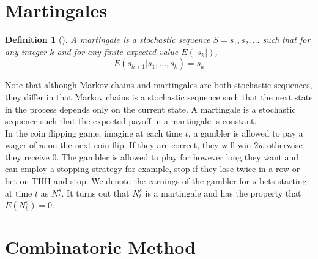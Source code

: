 \documentclass[12pt,haverford,landscape]{haverposter}
\newtheorem{definition}[theorem]{Definition}
\begin{document}
\begin{multicols}{4}

\color{Black} %

\section{\LARGE Martingales}

\begin{definition}[\cite{li}]
	A martingale is a stochastic sequence $S = s_1, s_2, ...$ such that for any
	integer $k$ and for any finite expected value $E(|s_k|)$,
	$$E(s_{k+1} | s_1, ..., s_k) = s_k$$		
\end{definition}

Note that although Markov chains and martingales are both stochastic sequences, they differ
in that Markov chains is a stochastic sequence such that
the next state in the process depends only on the current state. A martingale is a
stochastic sequence such that the expected payoff in a martingale is constant. \\
In the coin flipping game, imagine at each time $t$, a gambler
is allowed to pay a wager of $w$ on the next coin flip. If they are correct, they will
win $2w$ otherwise they receive $0$. The gambler is allowed to play for however long they
want and can employ a stopping strategy for example, stop if they lose twice in a row or
bet on THH and stop. We denote the earnings of the gambler for $s$ bets starting at time
$t$ as $N_t^s$. It turns out that $N_t^s$ is a martingale and has the property that
$E(N_t^s) = 0$.
\cite{textbook}



\color{Black} %

\section{\LARGE Combinatoric Method}




\end{multicols}
\end{document}
